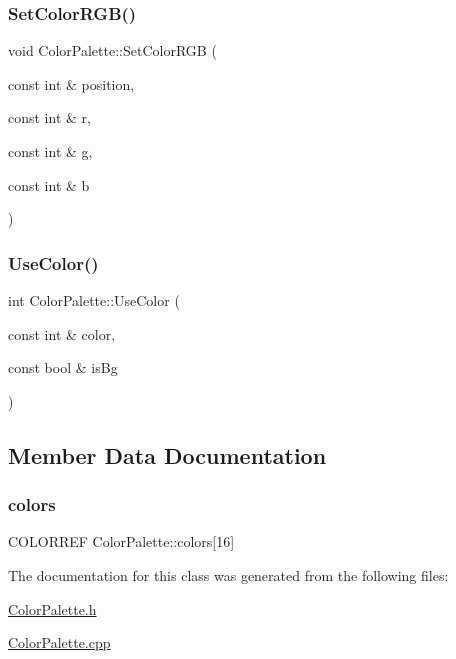 \subsubsection{\texorpdfstring{Set\+Color\+R\+G\+B()}{SetColorRGB()}}
{\footnotesize\ttfamily void Color\+Palette\+::\+Set\+Color\+R\+GB (\begin{DoxyParamCaption}\item[{const int \&}]{position,  }\item[{const int \&}]{r,  }\item[{const int \&}]{g,  }\item[{const int \&}]{b }\end{DoxyParamCaption})}

\mbox{\label{class_color_palette_a835334e6ce47a471f59055c247e05246}} 
\subsubsection{\texorpdfstring{Use\+Color()}{UseColor()}}
{\footnotesize\ttfamily int Color\+Palette\+::\+Use\+Color (\begin{DoxyParamCaption}\item[{const int \&}]{color,  }\item[{const bool \&}]{is\+Bg }\end{DoxyParamCaption})}



\subsection{Member Data Documentation}
\mbox{\label{class_color_palette_a4b12c031bcb8ccac141bca27bebefae5}} 
\subsubsection{\texorpdfstring{colors}{colors}}
{\footnotesize\ttfamily C\+O\+L\+O\+R\+R\+EF Color\+Palette\+::colors\mbox{[}16\mbox{]}\hspace{0.3cm}{\ttfamily [private]}}



The documentation for this class was generated from the following files\+:\begin{DoxyCompactItemize}
\item 
\hyperlink{_color_palette_8h}{Color\+Palette.\+h}\item 
\hyperlink{_color_palette_8cpp}{Color\+Palette.\+cpp}\end{DoxyCompactItemize}

